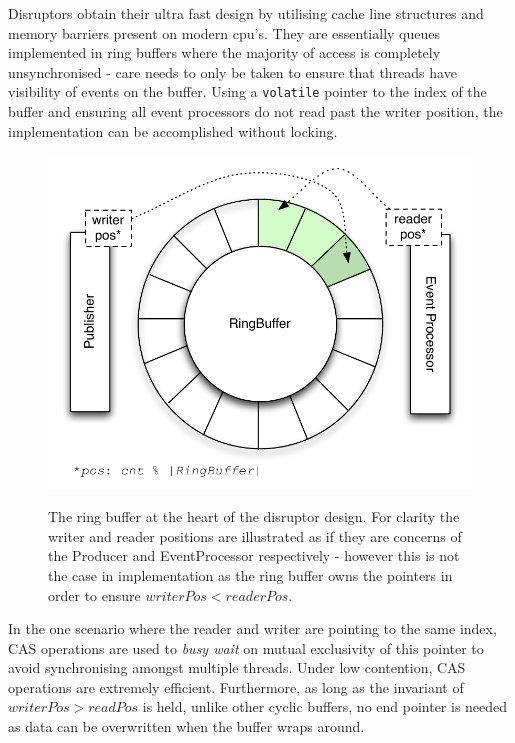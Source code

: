 \documentclass[a4paper,11pt]{scrreprt}
\begin{document}
Disruptors obtain their ultra fast design by utilising cache line structures and memory barriers present on modern \acrshort{cpu}'s. They are essentially queues implemented in ring buffers where the majority of access is completely unsynchronised - care needs to only be taken to ensure that threads have visibility of events on the buffer. Using a \texttt{volatile} pointer to the index of the buffer and ensuring all event processors do not read past the writer position, the implementation can be accomplished without locking. 
\begin{figure}[h]
\centering
\caption{The ring buffer at the heart of the disruptor design. For clarity the writer and reader positions are illustrated as if they are concerns of the Producer and EventProcessor respectively - however this is not the case in implementation as the ring buffer owns the pointers in order to ensure \(writerPos < readerPos\).}
\includegraphics[scale=0.65, trim=0 10 0 0, clip=true] {ringbuffer.pdf}
\label{fig:ringbuffer}
\end{figure}

In the one scenario where the reader and writer are pointing to the same index, CAS operations are used to \textit{busy wait} on mutual exclusivity of this pointer to avoid synchronising amongst multiple threads. Under low contention, CAS operations are extremely efficient. Furthermore, as long as the invariant of \(writerPos > readPos\) is held, unlike other cyclic buffers, no end pointer is needed as data can be overwritten when the buffer wraps around.
\end{document}
